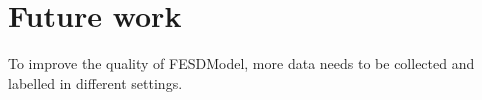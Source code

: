 \section{Future work}
\label{sec:future_work}

To improve the quality of FESDModel, more data needs to be collected and labelled in different settings. 


